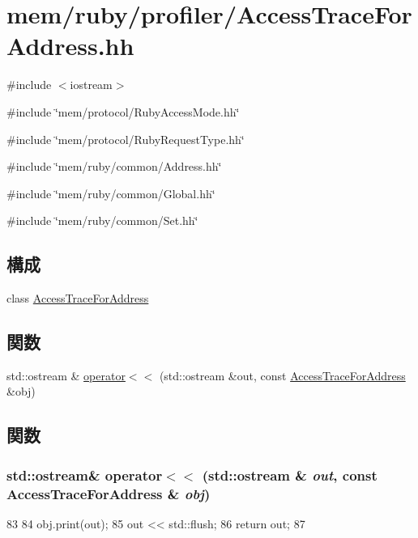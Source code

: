 \hypertarget{AccessTraceForAddress_8hh}{
\section{mem/ruby/profiler/AccessTraceForAddress.hh}
\label{AccessTraceForAddress_8hh}
}
{\ttfamily \#include $<$iostream$>$}\par
{\ttfamily \#include \char`\"{}mem/protocol/RubyAccessMode.hh\char`\"{}}\par
{\ttfamily \#include \char`\"{}mem/protocol/RubyRequestType.hh\char`\"{}}\par
{\ttfamily \#include \char`\"{}mem/ruby/common/Address.hh\char`\"{}}\par
{\ttfamily \#include \char`\"{}mem/ruby/common/Global.hh\char`\"{}}\par
{\ttfamily \#include \char`\"{}mem/ruby/common/Set.hh\char`\"{}}\par
\subsection*{構成}
\begin{DoxyCompactItemize}
\item 
class \hyperlink{classAccessTraceForAddress}{AccessTraceForAddress}
\end{DoxyCompactItemize}
\subsection*{関数}
\begin{DoxyCompactItemize}
\item 
std::ostream \& \hyperlink{AccessTraceForAddress_8hh_aebe2ddaa0ba995c8badad2ee0973c068}{operator$<$$<$} (std::ostream \&out, const \hyperlink{classAccessTraceForAddress}{AccessTraceForAddress} \&obj)
\end{DoxyCompactItemize}


\subsection{関数}
\hypertarget{AccessTraceForAddress_8hh_aebe2ddaa0ba995c8badad2ee0973c068}{
\subsubsection[{operator$<$$<$}]{\setlength{\rightskip}{0pt plus 5cm}std::ostream\& operator$<$$<$ (std::ostream \& {\em out}, \/  const {\bf AccessTraceForAddress} \& {\em obj})}}
\label{AccessTraceForAddress_8hh_aebe2ddaa0ba995c8badad2ee0973c068}



\begin{DoxyCode}
83 {
84     obj.print(out);
85     out << std::flush;
86     return out;
87 }
\end{DoxyCode}
